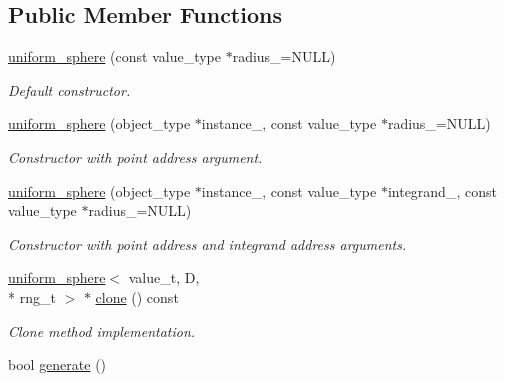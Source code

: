 \subsection*{Public Member Functions}
\begin{DoxyCompactItemize}
\item 
\hypertarget{a00549_a9611c8dc0eb531fbd583e438cd03be24}{\hyperlink{a00549_a9611c8dc0eb531fbd583e438cd03be24}{uniform\-\_\-sphere} (const value\-\_\-type $\ast$radius\-\_\-=N\-U\-L\-L)}\label{a00549_a9611c8dc0eb531fbd583e438cd03be24}

\begin{DoxyCompactList}\small\item\em Default constructor. \end{DoxyCompactList}\item 
\hypertarget{a00549_ac865601a1d2ab995fd8a2aef2b67f456}{\hyperlink{a00549_ac865601a1d2ab995fd8a2aef2b67f456}{uniform\-\_\-sphere} (object\-\_\-type $\ast$instance\-\_\-, const value\-\_\-type $\ast$radius\-\_\-=N\-U\-L\-L)}\label{a00549_ac865601a1d2ab995fd8a2aef2b67f456}

\begin{DoxyCompactList}\small\item\em Constructor with point address argument. \end{DoxyCompactList}\item 
\hypertarget{a00549_ab46b304a49f9b75debdb490a6147b702}{\hyperlink{a00549_ab46b304a49f9b75debdb490a6147b702}{uniform\-\_\-sphere} (object\-\_\-type $\ast$instance\-\_\-, const value\-\_\-type $\ast$integrand\-\_\-, const value\-\_\-type $\ast$radius\-\_\-=N\-U\-L\-L)}\label{a00549_ab46b304a49f9b75debdb490a6147b702}

\begin{DoxyCompactList}\small\item\em Constructor with point address and integrand address arguments. \end{DoxyCompactList}\item 
\hypertarget{a00549_af1681938ef57701d3c1ed88a3b28bc3a}{\hyperlink{a00549}{uniform\-\_\-sphere}$<$ value\-\_\-t, D, \\*
rng\-\_\-t $>$ $\ast$ \hyperlink{a00549_af1681938ef57701d3c1ed88a3b28bc3a}{clone} () const }\label{a00549_af1681938ef57701d3c1ed88a3b28bc3a}

\begin{DoxyCompactList}\small\item\em Clone method implementation. \end{DoxyCompactList}\item 
\hypertarget{a00549_a229e39ea995845bd2e381143502deb43}{bool \hyperlink{a00549_a229e39ea995845bd2e381143502deb43}{generate} ()}\label{a00549_a229e39ea995845bd2e381143502deb43}


\end{DoxyCompactItemize}
